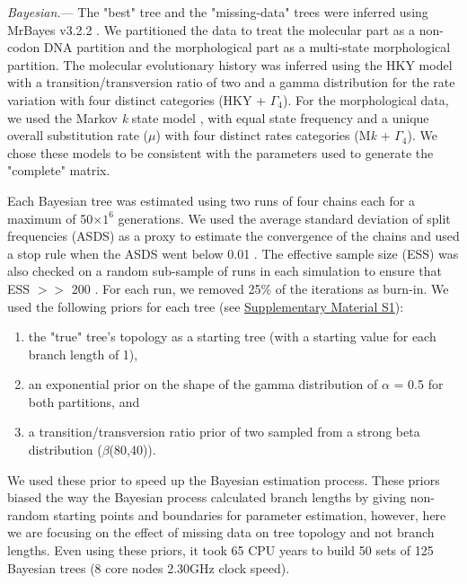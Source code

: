 \documentclass[12pt,letterpaper]{article}
\renewcommand{\subsubsection}[1]{%
\vspace{2ex}
\noindent
\textit{#1.}---}
\begin{document}
\subsubsection{Bayesian}
The "best" tree and the "missing-data" trees were inferred using MrBayes v3.2.2 \citep{Ronquist2012mrbayes}.
We partitioned the data to treat the molecular part as a non-codon DNA partition and the morphological part as a multi-state morphological partition.
The molecular evolutionary history was inferred using the HKY model with a transition/transversion ratio of two \citep{douadycomparison2003} and a gamma distribution for the rate variation with four distinct categories (HKY + $\Gamma_4$).
For the morphological data, we used the Markov \textit{k} state model \citep{lewisa2001}, with equal state frequency and a unique overall substitution rate ($\mu$) with four distinct rates categories (M\textit{k} + $\Gamma_4$).
We chose these models to be consistent with the parameters used to generate the "complete" matrix.

Each Bayesian tree was estimated using two runs of four chains each for a maximum of 50$\times$$1^6$ generations.
We used the average standard deviation of split frequencies (ASDS) as a proxy to estimate the convergence of the chains and used a stop rule when the ASDS went below 0.01 \citep{Ronquist2012mrbayes}.
The effective sample size (ESS) was also checked on a random sub-sample of runs in each simulation to ensure that ESS $>>$ 200 \citep{drummond2006ess}.
For each run, we removed 25\% of the iterations as burn-in.
We used the following priors for each tree (see \hyperref[SupplementaryMaterial]{Supplementary Material S1}):
\begin{enumerate}
\item the "true" tree’s topology as a starting tree (with a starting value for each branch length of 1),
\item an exponential prior on the shape of the gamma distribution of $\alpha$ = 0.5 for both partitions, and
\item a transition/transversion ratio prior of two sampled from a strong beta distribution ($\beta$(80,40)).
\end{enumerate}

We used these prior to speed up the Bayesian estimation process.
These priors biased the way the Bayesian process calculated branch lengths by giving non-random starting points and boundaries for parameter estimation, however, here we are focusing on the effect of missing data on tree topology and not branch lengths.
Even using these priors, it took 65 CPU years to build 50 sets of 125 Bayesian trees (8 core nodes 2.30GHz clock speed).
\end{document}
